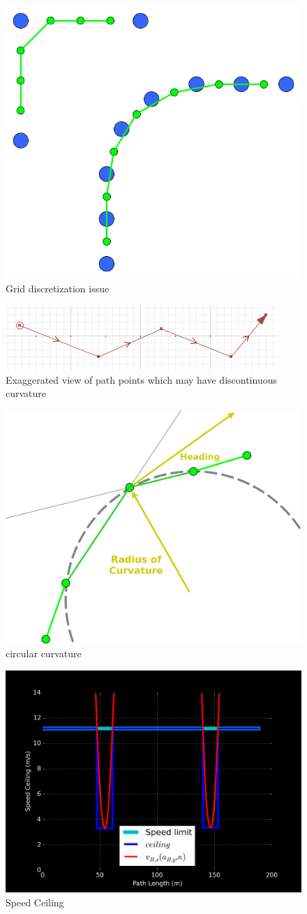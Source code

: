 \documentclass[letterpaper, 10 pt, conference]{ieeeconf}  %
\begin{document}
\begin{figure}[thpb]
  \centering
  \includegraphics[width=0.5\columnwidth]{graphics/LowResPathSample.png}
  \caption{Grid discretization issue}
  \label{fig:discretization}
\end{figure}
\begin{figure}[thpb]
  \centering
  \includegraphics[width=0.5\columnwidth]{graphics/linestring.png}
  \caption{Exaggerated view of path points which may have discontinuous curvature}
  \label{fig:disc}
\end{figure}

\begin{figure}[thpb]
  \centering
  \includegraphics[width=0.5\columnwidth]{graphics/CircularCurvature.png}
  \caption{circular curvature}
  \label{fig:curv}
\end{figure}

\begin{figure}[thpb]
  \centering
  \includegraphics[width=0.5\columnwidth]{graphics/speed_ceiling.png}
  \caption{Speed Ceiling}
  \label{fig:speedceil}
\end{figure}
\end{document}
